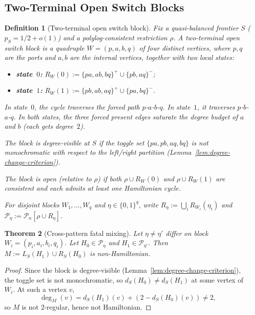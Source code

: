 \documentclass[11pt]{article}
\newtheorem{theorem}{Theorem}[section]
\newtheorem{definition}[theorem]{Definition}
\begin{document}
\subsection{Two-Terminal Open Switch Blocks}
\label{subsec:open-switch-cells}

\begin{definition}[Two-terminal open switch block]
\label{def:switch-block}
Fix a quasi-balanced frontier $S$ ($p_S = 1/2 + o(1)$) and a polylog-consistent
restriction $\rho$.  A \emph{two-terminal open switch block} is a quadruple
$W = (p, a, b, q)$ of four distinct vertices, where $p, q$ are the \emph{ports}
and $a, b$ are the \emph{internal vertices}, together with two local states:
\begin{itemize}
\item \textbf{state~$0$:}
  $R_W(0) := \{pa, ab, bq\}^+ \cup \{pb, aq\}^-$;
\item \textbf{state~$1$:}
  $R_W(1) := \{pb, ab, aq\}^+ \cup \{pa, bq\}^-$.
\end{itemize}
In state~$0$, the cycle traverses the forced path $p$-$a$-$b$-$q$.
In state~$1$, it traverses $p$-$b$-$a$-$q$.
In both states, the three forced present edges saturate the degree budget
of $a$ and $b$ (each gets degree~$2$).

The block is \emph{degree-visible} at $S$ if the toggle set
$\{pa, pb, aq, bq\}$ is not monochromatic with respect to the left/right
partition (Lemma~\ref{lem:degree-change-criterion}).

The block is \emph{open} (relative to $\rho$) if both $\rho \cup R_W(0)$
and $\rho \cup R_W(1)$ are consistent and each admits at least one
Hamiltonian cycle.

For disjoint blocks $W_1, \ldots, W_q$ and $\eta \in \{0,1\}^q$, write
$R_\eta := \bigcup_i R_{W_i}(\eta_i)$ and
$\mathcal{P}_\eta := \mathcal{P}_n[\rho \cup R_\eta]$.
\end{definition}

\begin{theorem}[Cross-pattern fatal mixing]
\label{thm:open-switch-anti-sharing}
Let $\eta \neq \eta'$ differ on block $W_i = (p_i, a_i, b_i, q_i)$.
Let $H_0 \in \mathcal{P}_\eta$ and $H_1 \in \mathcal{P}_{\eta'}$.
Then $M := L_S(H_1) \cup R_S(H_0)$ is non-Hamiltonian.
\end{theorem}

\begin{proof}
Since the block is degree-visible (Lemma~\ref{lem:degree-change-criterion}),
the toggle set is not monochromatic, so $d_S(H_0) \neq d_S(H_1)$ at some
vertex of $W_i$.  At such a vertex $v$,
\[
\deg_M(v) = d_S(H_1)(v) + (2 - d_S(H_0)(v)) \neq 2,
\]
so $M$ is not $2$-regular, hence not Hamiltonian.
\end{proof}
\end{document}
